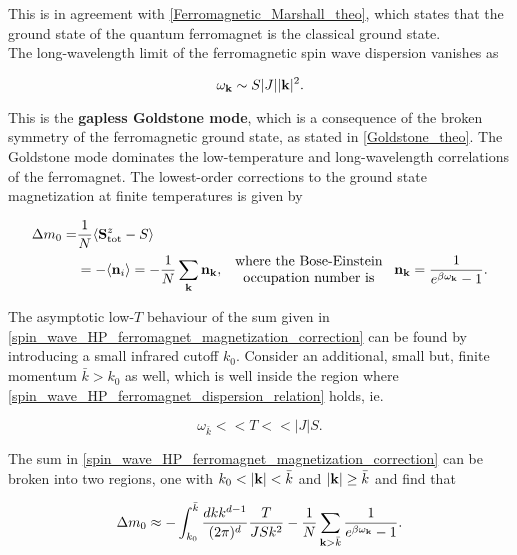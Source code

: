 This is in agreement with \cref{Ferromagnetic_Marshall_theo}, which states that the ground state of the quantum ferromagnet is the classical ground state. \\

The long-wavelength limit of the ferromagnetic spin wave dispersion vanishes as 

\begin{equation}
    \omega_{{\bf k}} \sim S |J| |{\bf k}|^2. 
    \label{spin_wave_HP_ferromagnet_dispersion_relation}
\end{equation}
   
This is the \textbf{gapless Goldstone mode}, which is a 
consequence of the broken symmetry of the ferromagnetic 
ground state, as stated in \cref{Goldstone_theo}. The 
Goldstone mode dominates the low-temperature and 
long-wavelength correlations of the ferromagnet. The 
lowest-order corrections to the ground state magnetization at finite temperatures is given by 

\begin{equation}
    \begin{split}
        \Delta m_0 =& \frac{1}{N} \langle {\bf S}^z_{\textnormal{tot}} - S \rangle \\
        &= - \langle {\bf n}_i \rangle = -\frac{1}{N} \sum_{{\bf k}} {\bf n}_{{\bf k}}, \begin{array}{cc}
             \textnormal{ where the Bose-Einstein }  \\
             \textnormal{ occupation number is }
        \end{array} {\bf n}_{{\bf k}} = \frac{1}{e^{\beta \omega_{{\bf k}}} - 1}. 
    \end{split}
    \label{spin_wave_HP_ferromagnet_magnetization_correction}
\end{equation}

The asymptotic low-$T$ behaviour of the sum given in  \cref{spin_wave_HP_ferromagnet_magnetization_correction} can be found by introducing a small infrared cutoff $k_0$. Consider an additional, small but, finite momentum $\bar{k} > k_0$ as well, which is well inside the region where \cref{spin_wave_HP_ferromagnet_dispersion_relation} holds, ie. 

$$
    \omega_{\bar{k}} << T << |J| S.
$$

The sum in \cref{spin_wave_HP_ferromagnet_magnetization_correction} can be broken into two regions, one with $k_0 < |{\bf k}| < \bar{k}$ and $|{\bf k}| \geq {\bar{k}}$ and find that 

\begin{equation}
    \Delta m_0 \approx - \int_{k_0}^{\bar{k}} \frac{dk k^{d-1}}{(2\pi)^d} \frac{T}{J S k^2} - \frac{1}{N} \sum_{{\bf k} > \bar{k}} \frac{1}{e^{\beta \omega_{{\bf k}}} - 1}.
\end{equation}

